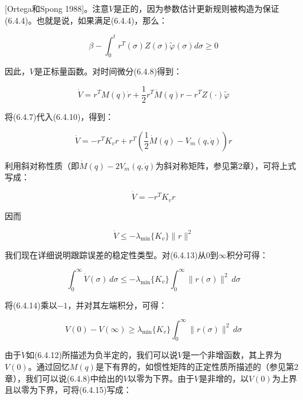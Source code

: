 \documentclass[12pt,a4paper]{ctexart}
\begin{document}
[Ortega和Spong 1988]。注意$V$是正的，因为参数估计更新规则被构造为保证(6.4.4)。也就是说，如果满足(6.4.4)，那么：

\begin{equation}\label{eq:6.4.9}
\beta - \int_0^t r^T(\sigma)Z(\sigma)\tilde{\varphi}(\sigma)d\sigma \geq 0
\end{equation}

因此，$V$是正标量函数。对时间微分(6.4.8)得到：

\begin{equation}\label{eq:6.4.10}
\dot{V} = r^T M(q)\dot{r} + \frac{1}{2}r^T \dot{M}(q)r - r^T Z(\cdot)\tilde{\varphi}
\end{equation}

将(6.4.7)代入(6.4.10)，得到：

\begin{equation}\label{eq:6.4.11}
\dot{V} = -r^T K_v r + r^T \left( \frac{1}{2}\dot{M}(q) - V_m(q, \dot{q}) \right) r
\end{equation}

利用斜对称性质（即$\dot{M}(q)-2V_m(q,\dot{q})$为斜对称矩阵，参见第2章），可将上式写成：

\begin{equation}\label{eq:6.4.12}
\dot{V} = -r^T K_v r
\end{equation}

因而

\begin{equation}\label{eq:6.4.13}
\dot{V} \leq -\lambda_{\min}\{K_v\}\|r\|^2
\end{equation}

我们现在详细说明跟踪误差的稳定性类型。对(6.4.13)从$0$到$\infty$积分可得：

\begin{equation}\label{eq:6.4.14}
\int_0^\infty \dot{V}(\sigma)\,d\sigma \leq -\lambda_{\min}\{K_v\}\int_0^\infty \|r(\sigma)\|^2\,d\sigma
\end{equation}

将(6.4.14)乘以$-1$，并对其左端积分，可得：

\begin{equation}\label{eq:6.4.15}
V(0) - V(\infty) \geq \lambda_{\min}\{K_v\}\int_0^\infty \|r(\sigma)\|^2\,d\sigma
\end{equation}

由于$\dot{V}$如(6.4.12)所描述为负半定的，我们可以说$V$是一个非增函数，其上界为$V(0)$。通过回忆$M(q)$是下有界的，如惯性矩阵的正定性质所描述的（参见第2章），我们可以说(6.4.8)中给出的$V$以零为下界。由于$V$是非增的，以$V(0)$为上界且以零为下界，可将(6.4.15)写成：
\end{document}
